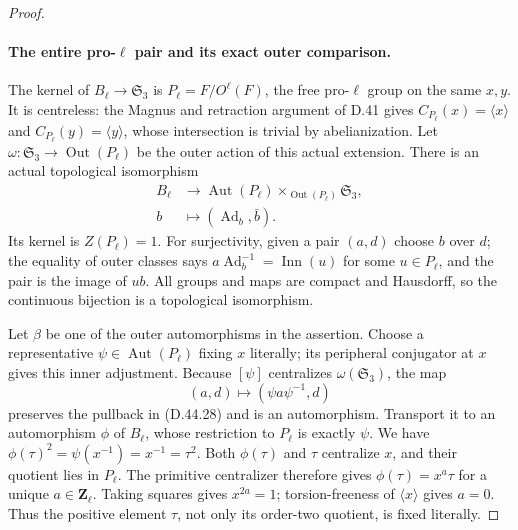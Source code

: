 \begin{proof}
\paragraph{The entire pro-\(\ell\) pair and its exact outer comparison.}
The kernel of \(B_\ell\to\mathfrak S_3\) is
\(P_\ell=F/O^\ell(F)\), the free pro-\(\ell\) group on the
same \(x,y\). It is centreless: the Magnus and retraction
argument of D.41 gives
\(C_{P_\ell}(x)=\langle x\rangle\) and
\(C_{P_\ell}(y)=\langle y\rangle\), whose intersection is
trivial by abelianization.
Let
\(\omega:\mathfrak S_3\to\operatorname{Out}(P_\ell)\)
be the outer action of this actual extension.
There is an actual topological isomorphism
\[
 \begin{split}
 B_\ell&\longrightarrow
       \operatorname{Aut}(P_\ell)
          \mathbin{\times_{\operatorname{Out}(P_\ell)}}
                   \mathfrak S_3,\\
 b&\longmapsto(\operatorname{Ad}_b,\bar b).
 \end{split}
 \tag{D.44.28}
\]
Its kernel is \(Z(P_\ell)=1\).
For surjectivity, given a pair \((a,d)\) choose \(b\) over
\(d\); the equality of outer classes says
\(a\operatorname{Ad}_b^{-1}=\operatorname{Inn}(u)\) for
some \(u\in P_\ell\), and the pair is the image of \(ub\).
All groups and maps are compact and Hausdorff, so the
continuous bijection is a topological isomorphism.

Let \(\beta\) be one of the outer automorphisms in the
assertion. Choose a representative
\(\psi\in\operatorname{Aut}(P_\ell)\) fixing \(x\)
literally; its peripheral conjugator at \(x\) gives this
inner adjustment. Because \([\psi]\) centralizes
\(\omega(\mathfrak S_3)\), the map
\[
                 (a,d)\longmapsto
                       (\psi a\psi^{-1},d)
 \tag{D.44.29}
\]
preserves the pullback in \textup{(D.44.28)} and is an
automorphism. Transport it to an automorphism \(\phi\)
of \(B_\ell\), whose restriction to \(P_\ell\) is
exactly \(\psi\).
We have
\(\phi(\tau)^2=\psi(x^{-1})=x^{-1}=\tau^2\).
Both \(\phi(\tau)\) and \(\tau\) centralize \(x\),
and their quotient lies in \(P_\ell\).
The primitive centralizer therefore gives
\(\phi(\tau)=x^a\tau\) for a unique \(a\in\mathbf Z_\ell\).
Taking squares gives \(x^{2a}=1\); torsion-freeness of
\(\langle x\rangle\) gives \(a=0\).
Thus the positive element \(\tau\), not only its
order-two quotient, is fixed literally.


\end{proof}
